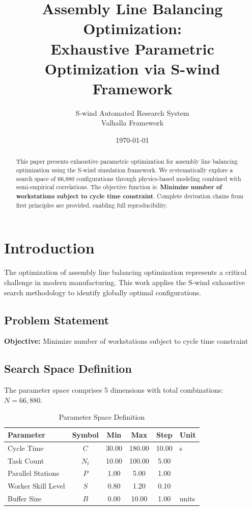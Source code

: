\documentclass[11pt,twocolumn]{article}
\title{Assembly Line Balancing Optimization: \\Exhaustive Parametric Optimization via S-wind Framework}
\author{S-wind Automated Research System\\Valhalla Framework}
\date{\today}
\begin{document}
\maketitle

\begin{abstract}
This paper presents exhaustive parametric optimization for assembly line balancing optimization using the S-wind simulation framework.
We systematically explore a search space of 66,880 configurations through physics-based modeling
combined with semi-empirical correlations. The objective function is: \textbf{Minimize number of workstations subject to cycle time constraint}.
Complete derivation chains from first principles are provided, enabling full reproducibility.
\end{abstract}

\section{Introduction}
The optimization of assembly line balancing optimization represents a critical challenge in modern manufacturing.
This work applies the S-wind exhaustive search methodology to identify globally optimal configurations.

\subsection{Problem Statement}
\textbf{Objective:} Minimize number of workstations subject to cycle time constraint

\subsection{Search Space Definition}
The parameter space comprises 5 dimensions with total combinations: $N = 66,880$.

\begin{table}[h]
\centering
\caption{Parameter Space Definition}
\begin{tabular}{@{}lccccl@{}}
\toprule
Parameter & Symbol & Min & Max & Step & Unit \\
\midrule
Cycle Time & $C$ & 30.00 & 180.00 & 10.00 & s \\
Task Count & $N_t$ & 10.00 & 100.00 & 5.00 &  \\
Parallel Stations & $P$ & 1.00 & 5.00 & 1.00 &  \\
Worker Skill Level & $S$ & 0.80 & 1.20 & 0.10 &  \\
Buffer Size & $B$ & 0.00 & 10.00 & 1.00 & units \\
\bottomrule
\end{tabular}
\end{table}
\end{document}
